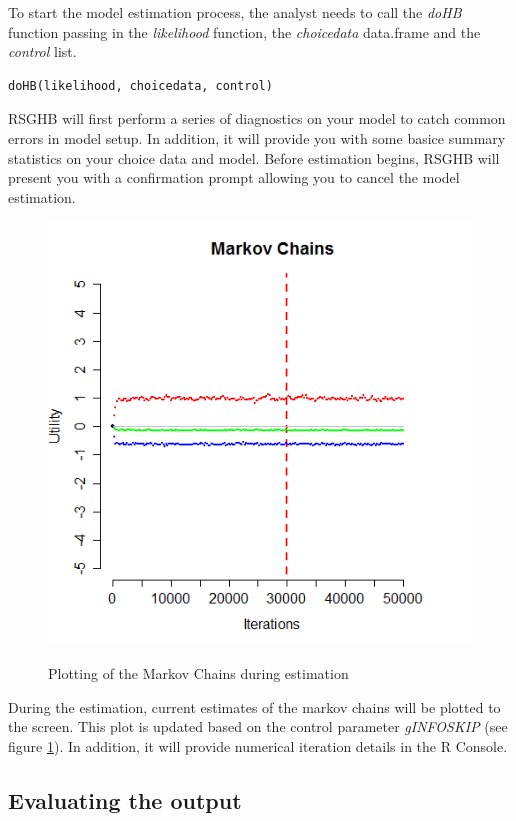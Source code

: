 \documentclass{article}\usepackage{graphicx, color}
\begin{document}
To start the model estimation process, the analyst needs to call the \emph{doHB} function passing in the \emph{likelihood} function, the \emph{choicedata} data.frame and the \emph{control} list. 

\begin{verbatim}
doHB(likelihood, choicedata, control)
\end{verbatim}

RSGHB will first perform a series of diagnostics on your model to catch common errors in model setup. In addition, it will provide you with some basice summary statistics on your choice data and model. Before estimation begins, RSGHB will present you with a confirmation prompt allowing you to cancel the model estimation.

\begin{figure}
\caption{Plotting of the Markov Chains during estimation}
\includegraphics[scale=0.50]{MNL_markovChains.png}
\label{MarkovChain}
\end{figure}

During the estimation, current estimates of the markov chains will be plotted to the screen. This plot is updated based on the control parameter \emph{gINFOSKIP} (see figure \ref{MarkovChain}). In addition, it will provide numerical iteration details in the R Console.



\subsection*{Evaluating the output}
\end{document}
